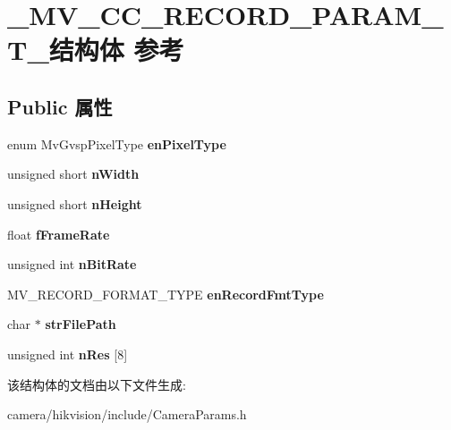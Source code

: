 \hypertarget{struct___m_v___c_c___r_e_c_o_r_d___p_a_r_a_m___t__}{}\section{\+\_\+\+M\+V\+\_\+\+C\+C\+\_\+\+R\+E\+C\+O\+R\+D\+\_\+\+P\+A\+R\+A\+M\+\_\+\+T\+\_\+结构体 参考}
\label{struct___m_v___c_c___r_e_c_o_r_d___p_a_r_a_m___t__}
\subsection*{Public 属性}
\begin{DoxyCompactItemize}
\item 
\mbox{\label{struct___m_v___c_c___r_e_c_o_r_d___p_a_r_a_m___t___a32250915d5a7814a0491eb5de518e58c}} 
enum Mv\+Gvsp\+Pixel\+Type {\bfseries en\+Pixel\+Type}
\item 
\mbox{\label{struct___m_v___c_c___r_e_c_o_r_d___p_a_r_a_m___t___a3f9b88689410257f20406656a6aa52c9}} 
unsigned short {\bfseries n\+Width}
\item 
\mbox{\label{struct___m_v___c_c___r_e_c_o_r_d___p_a_r_a_m___t___a371b77ac894f16a53082bcc253d944be}} 
unsigned short {\bfseries n\+Height}
\item 
\mbox{\label{struct___m_v___c_c___r_e_c_o_r_d___p_a_r_a_m___t___a33cda2cbf58ee33f59dc24c9e8130b9b}} 
float {\bfseries f\+Frame\+Rate}
\item 
\mbox{\label{struct___m_v___c_c___r_e_c_o_r_d___p_a_r_a_m___t___a3266b44a84e2f04b3466eb31072e7141}} 
unsigned int {\bfseries n\+Bit\+Rate}
\item 
\mbox{\label{struct___m_v___c_c___r_e_c_o_r_d___p_a_r_a_m___t___aaa923cd15757aaaf89064f6b2b9ad2db}} 
M\+V\+\_\+\+R\+E\+C\+O\+R\+D\+\_\+\+F\+O\+R\+M\+A\+T\+\_\+\+T\+Y\+PE {\bfseries en\+Record\+Fmt\+Type}
\item 
\mbox{\label{struct___m_v___c_c___r_e_c_o_r_d___p_a_r_a_m___t___ae910a2415fa44c0993a00a64e0bd5fbb}} 
char $\ast$ {\bfseries str\+File\+Path}
\item 
\mbox{\label{struct___m_v___c_c___r_e_c_o_r_d___p_a_r_a_m___t___ae557b9946d858d863ba2c47588189e57}} 
unsigned int {\bfseries n\+Res} \mbox{[}8\mbox{]}
\end{DoxyCompactItemize}


该结构体的文档由以下文件生成\+:\begin{DoxyCompactItemize}
\item 
camera/hikvision/include/Camera\+Params.\+h\end{DoxyCompactItemize}
